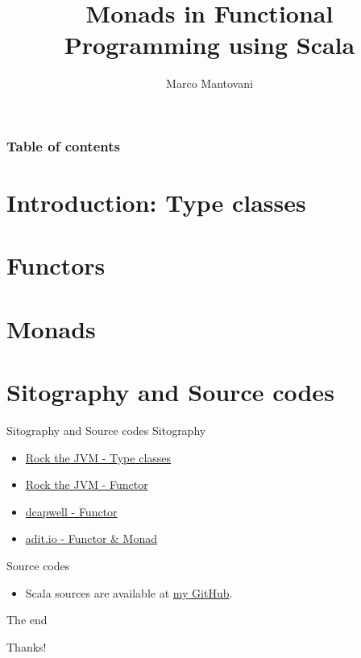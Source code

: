 \documentclass{beamer}
\title[Monads in Functional Programming]{Monads in Functional Programming using Scala}
\author{Marco Mantovani}
\begin{document}
	
	\begin{frame}
		\maketitle
	\end{frame}
	
	\begin{frame}
		\frametitle{Table of contents}
		\tableofcontents
	\end{frame}
	
	\section{Introduction: Type classes}
	
	
	\section{Functors}
	
			
	\section{Monads}
	

	\section{Sitography  and Source codes}
	\begin{frame}{Sitography  and Source codes}
		Sitography  
		\begin{itemize}
			\item \href{https://blog.rockthejvm.com/why-are-typeclasses-useful/}{Rock the JVM - Type classes}
			\item \href{https://blog.rockthejvm.com/what-the-functor/}{Rock the JVM - Functor}
			\item \href{http://dcapwell.github.io/scala-tour/Functor.html}{dcapwell - Functor}
			\item \href{https://adit.io/posts/2013-04-17-functors,\_applicatives,\_and\_monads\_in\_pictures.html}{adit.io - Functor \& Monad}
		\end{itemize}
	
		Source codes
		\begin{itemize}
			\item Scala sources are available at \href{https://github.com/Tovy97/TypeclassFunctorMonad\_Scala}{my GitHub}.
		\end{itemize}
	\end{frame}

	\begin{frame}{The end}	
		\begin{center}
			Thanks!
		\end{center}
	\end{frame}
\end{document}
